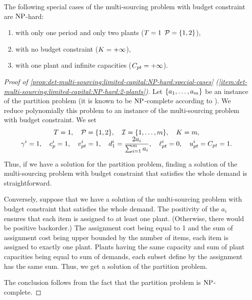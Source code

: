\begin{prop}\label{prop:det-multi-sourcing:limited-capital:NP-hard:special-cases}
  The following special cases of the multi-sourcing problem with budget constraint are $\operatorname{NP}$-hard:
  \begin{enumerate}
    \item\label{item:det-multi-sourcing:limited-capital:NP-hard:2-plants}
    with only one period and only two plants ($T=1$ $\plants=\crbracket{1,2}$),
    \item\label{item:det-multi-sourcing:limited-capital:NP-hard:unbounded-assignment-cost}
    with no budget constraint ($K=+\infty$),
    \item\label{item:det-multi-sourcing:limited-capital:NP-hard:infinite-capacities}
    with one plant and infinite capacities ($C_{pt}=+\infty$).
  \end{enumerate}
\end{prop}


\begin{proof}[Proof of \cref{prop:det-multi-sourcing:limited-capital:NP-hard:special-cases} (\cref{item:det-multi-sourcing:limited-capital:NP-hard:2-plants})]
Let $\crbracket{a_1,\ldots,a_m}$ be an instance of the partition problem (it is known to be $\operatorname{NP}$-complete according to \citet{Garey1979}).
We reduce polynomially this problem to an instance of the multi-sourcing problem with budget constraint.
We set
\begin{equation}
\begin{array}{c}
  \ds
  \horizon=1
  ,\quad
  \plants=\crbracket{1,2}
  ,\quad
  \REF=\range[1]{m}
  ,\quad
  \capital = m,
  \\ \smallskip
  \ds
  \backorder^i=1
  ,\quad
  \affect_p^i=1
  ,\quad
  \rate_{pt}^i=1
  ,\quad
  \demand_1^i=\frac{2a_i}{\sum_{i=1}^{m}a_i}
  ,\quad
  \lb_{pt}^i=0
  ,\quad
  \ub_{pt}^i=\capacity_{pt}=1.
\end{array}
\end{equation}
Thus, if we have a solution for the partition problem, finding a solution of the multi-sourcing problem with budget constraint that satisfies the whole demand is straightforward.


Conversely, suppose that we have a solution of the multi-sourcing problem with budget constraint that satisfies the whole demand.
The positivity of the $a_i$ ensures that each item is assigned to at least one plant.
(Otherwise, there would be positive backorder.)
The assignment cost being equal to 1 and the sum of assignment cost being upper bounded by the number of items, each item is assigned to exactly one plant.
Plants having the same capacity and sum of plant capacities being equal to sum of demands, each subset define by the assignment has the same sum.
Thus, we get a solution of the partition problem.


The conclusion follows from the fact that the partition problem is $\operatorname{NP}$-complete.
\end{proof}



